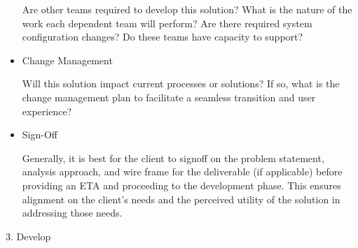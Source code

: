 \documentclass[]{book}
\begin{document}
\begin{itemize}
  Are other teams required to develop this solution? What is the nature of the work each dependent team will perform? Are there required system configuration changes? Do these teams have capacity to support?
\item
  Change Management

  Will this solution impact current processes or solutions? If so, what is the change management plan to facilitate a seamless transition and user experience?
\item
  Sign-Off

  Generally, it is best for the client to signoff on the problem statement, analysis approach, and wire frame for the deliverable (if applicable) before providing an ETA and proceeding to the development phase. This ensures alignment on the client's needs and the perceived utility of the solution in addressing those needs.
\end{itemize}

3. Develop
\end{document}
